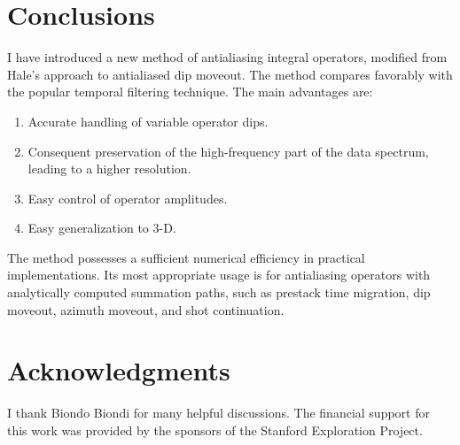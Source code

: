 \section{Conclusions}
I have introduced a new method of antialiasing integral operators,
modified from Hale's approach to antialiased dip moveout. The method
compares favorably with the popular temporal filtering technique. The
main advantages are:
\begin{enumerate}
\item Accurate handling of variable operator dips.
\item Consequent preservation of the high-frequency part of the data
spectrum, leading to a higher resolution.
\item Easy control of operator amplitudes.
\item Easy generalization to 3-D.
\end{enumerate}
The method possesses a sufficient numerical efficiency in practical
implementations. Its most appropriate usage is for antialiasing
operators with analytically computed summation paths, such as prestack
time migration, dip moveout, azimuth moveout, and shot continuation.

\section{Acknowledgments}

I thank Biondo Biondi for many helpful discussions. The financial
support for this work was provided by the sponsors of the Stanford
Exploration Project.




